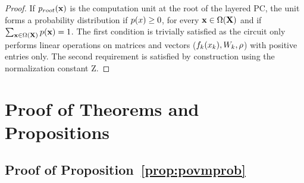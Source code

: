 \begin{proof}
	If $p_{root} (\mathbf{x})$ is the computation unit at the root of the layered PC, the unit forms a probability distribution if $p(x)\geq 0$, for every $\mathbf{x} \in \Omega(\mathbf{X})$ and if $\sum_{\mathbf{x} \in \Omega(\mathbf{X})} p(\mathbf{x})=1$. The first condition is trivially satisfied as the circuit only performs linear operations on matrices and vectors ($f_k(x_k), W_k, \rho$) with positive entries only.
	The second requirement is satisfied by construction using the normalization constant Z.
\end{proof}























\section{Proof of Theorems and Propositions}




\subsection{Proof of Proposition~\ref{prop:povmprob}}
\label{sec:proof:prop:povmprob}

